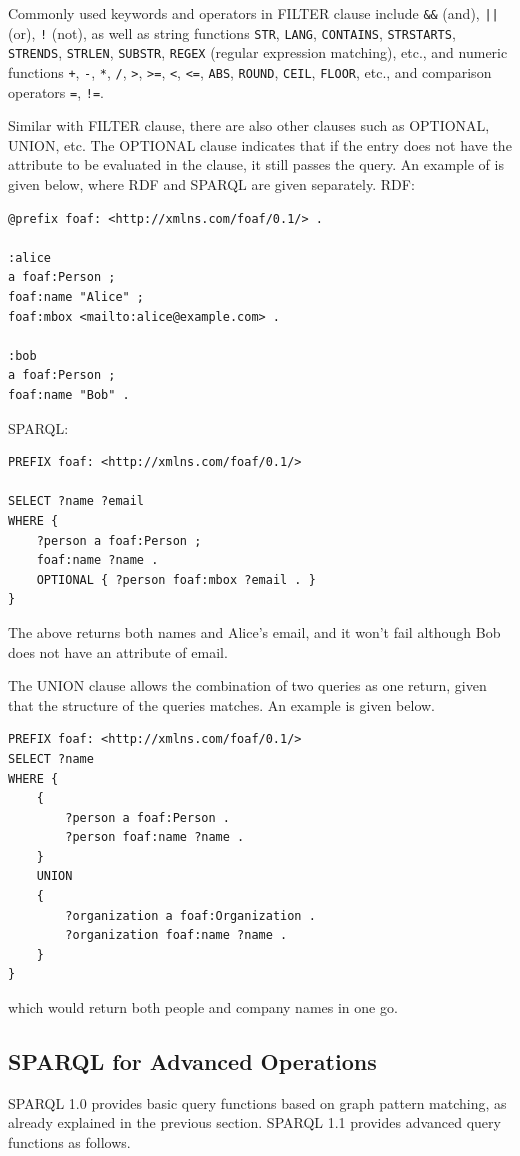 Commonly used keywords and operators in FILTER clause include \verb|&&| (and), \verb$||$ (or), \verb|!| (not), as well as string functions \verb|STR|, \verb|LANG|, \verb|CONTAINS|, \verb|STRSTARTS|, \verb|STRENDS|, \verb|STRLEN|, \verb|SUBSTR|, \verb|REGEX| (regular expression matching), etc., and numeric functions \verb|+|, \verb|-|, \verb|*|, \verb|/|, \verb|>|, \verb|>=|, \verb|<|, \verb|<=|, \verb|ABS|, \verb|ROUND|, \verb|CEIL|, \verb|FLOOR|, etc., and comparison operators \verb|=|, \verb|!=|.

Similar with FILTER clause, there are also other clauses such as OPTIONAL, UNION, etc. The OPTIONAL clause indicates that if the entry does not have the attribute to be evaluated in the clause, it still passes the query. An example of is given below, where RDF and SPARQL are given separately. RDF:
\begin{lstlisting}
@prefix foaf: <http://xmlns.com/foaf/0.1/> .

:alice
a foaf:Person ;
foaf:name "Alice" ;
foaf:mbox <mailto:alice@example.com> .

:bob
a foaf:Person ;
foaf:name "Bob" .
\end{lstlisting}
SPARQL:
\begin{lstlisting}
PREFIX foaf: <http://xmlns.com/foaf/0.1/>

SELECT ?name ?email
WHERE {
	?person a foaf:Person ;
	foaf:name ?name .
	OPTIONAL { ?person foaf:mbox ?email . }
}
\end{lstlisting}
The above returns both names and Alice's email, and it won't fail although Bob does not have an attribute of email.

The UNION clause allows the combination of two queries as one return, given that the structure of the queries matches. An example is given below.
\begin{lstlisting}
PREFIX foaf: <http://xmlns.com/foaf/0.1/>
SELECT ?name
WHERE {
	{
		?person a foaf:Person .
		?person foaf:name ?name .
	}
	UNION
	{
		?organization a foaf:Organization .
		?organization foaf:name ?name .
	}
}
\end{lstlisting}
which would return both people and company names in one go.

\subsection{SPARQL for Advanced Operations}

SPARQL 1.0 provides basic query functions based on graph pattern matching, as already explained in the previous section. SPARQL 1.1 provides advanced query functions as follows.

